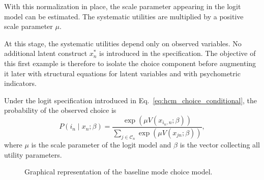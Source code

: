 \documentclass[12pt,a4paper]{article}
\newcommand{\PurpHWH}{\mathrm{PurpHWH}}
\newcommand{\TimeCar}{\mathrm{TimeCar}}
\newcommand{\TimePT}{\mathrm{TimePT}}
\newcommand{\CostCar}{\mathrm{CostCar}}
\newcommand{\MarginalCostPT}{\mathrm{MarginalCostPT}}
\newcommand{\distance}{\mathrm{Distance}}
\begin{document}
With this normalization in place, the scale parameter appearing in the
logit model can be estimated. The systematic utilities are multiplied
by a positive scale parameter \(\mu\).

At this stage, the systematic utilities depend only on observed
variables. No additional latent construct $x_n^*$ is introduced in the
specification. The objective of this first example is therefore to
isolate the choice component before augmenting it later with
structural equations for latent variables and with psychometric
indicators.

Under the logit specification introduced in
Eq.~\eqref{eq:hcm_choice_conditional}, the probability of the observed
choice is
\begin{equation}
  \label{eq:example1_logit_probability}
  P(i_n \mid x_n;\beta) = \frac{\exp\!\left(\mu V(x_{i_n,n};\beta)\right)} {\sum_{j \in \mathcal C_n} \exp\!\left(\mu
    V(x_{jn};\beta)\right)},
\end{equation}
where $\mu$ is the scale parameter of the logit model and $\beta$ is
the vector collecting all utility parameters.

\begin{figure}[htbp]
\centering
{}
\caption{Graphical representation of the baseline mode choice model.}
\label{fig:baseline_logit_tikz}
\end{figure}
\end{document}
